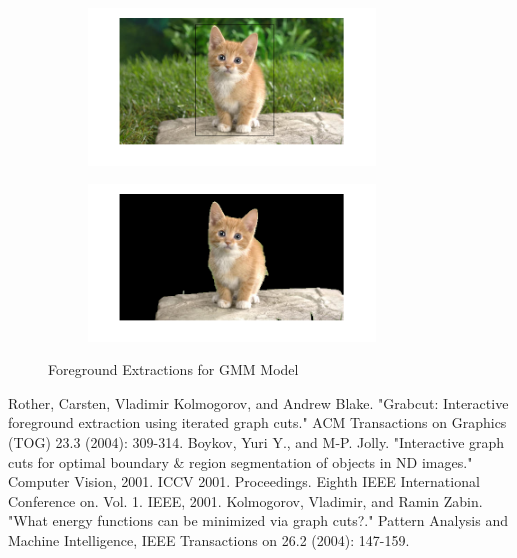 \documentclass[a4paper]{article}
\begin{document}
\begin{figure}[h]
\begin{subfigure}{.5\textwidth}
  \centering
  \includegraphics[width = 3in]{cat_in}
  \label{fig:sfig2}
\end{subfigure}
\begin{subfigure}{.5\textwidth}
  \centering
  \includegraphics[width = 3in]{cat_out}
  \label{fig:sfig2}
\end{subfigure}



\caption{Foreground Extractions for GMM Model}
\end{figure}

\begin{thebibliography}{10}

 Rother, Carsten, Vladimir Kolmogorov, and Andrew Blake. "Grabcut: Interactive foreground extraction using iterated graph cuts." ACM Transactions on Graphics (TOG) 23.3 (2004): 309-314.
 Boykov, Yuri Y., and M-P. Jolly. "Interactive graph cuts for optimal boundary \& region segmentation of objects in ND images." Computer Vision, 2001. ICCV 2001. Proceedings. Eighth IEEE International Conference on. Vol. 1. IEEE, 2001.
 Kolmogorov, Vladimir, and Ramin Zabin. "What energy functions can be minimized via graph cuts?." Pattern Analysis and Machine Intelligence, IEEE Transactions on 26.2 (2004): 147-159.
\end{thebibliography}
\end{document}
